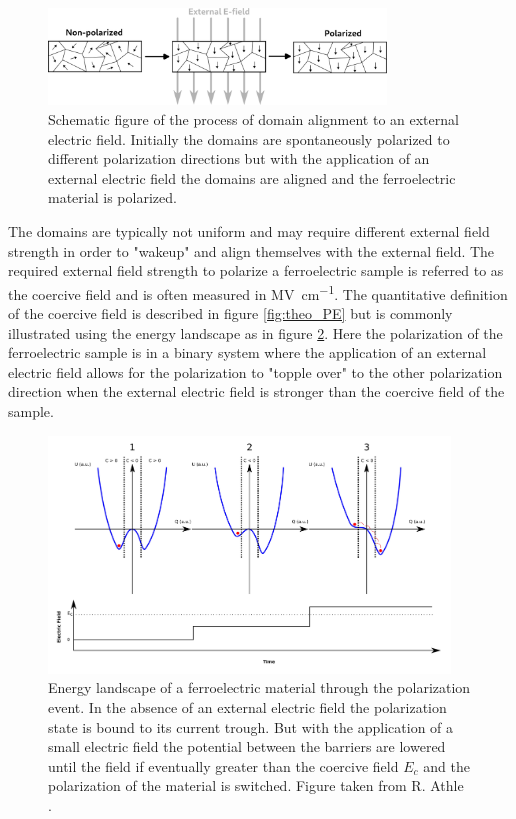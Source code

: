 \documentclass[11pt,twoside]{eitExjobb}
\begin{document}
\begin{figure}[htbp]
    \centering
    \includegraphics[width=0.80\textwidth]{fig/img/polarized.png}
    \caption{Schematic figure of the process of domain alignment to an external
    electric field. Initially the domains are spontaneously polarized to
    different polarization directions but with the application of an external
    electric field the domains are aligned and the ferroelectric material is
    polarized.}
    \label{fig:theo_domain}
\end{figure}

The domains are typically not uniform and may require different external field
strength in order to "wakeup" and align themselves with the external field. The
required external field strength to polarize a ferroelectric sample is referred
to as the coercive field and is often measured in
\si{\mega\volt\per\centi\meter}. The quantitative definition of the coercive
field is described in figure \ref{fig:theo_PE} but is commonly illustrated
using the energy landscape as in figure \ref{fig:theo_Ec}. Here the
polarization of the ferroelectric sample is in a binary system where the
application of an external electric field allows for the polarization to
"topple over" to the other polarization direction when the external electric
field is stronger than the coercive field of the sample.

\begin{figure}[htbp]
    \centering
    \includegraphics[width=0.95\textwidth]{fig/img/coercivefield.png}
    \caption{Energy landscape of a ferroelectric material through the
    polarization event. In the absence of an external electric field the
    polarization state is bound to its current trough. But with the application
    of a small electric field the potential between the barriers are lowered until
    the field if eventually greater than the coercive field $E_c$ and the
    polarization of the material is switched. Figure taken from R. Athle
    \cite{athle2019development}.}
    \label{fig:theo_Ec}
\end{figure}
\end{document}
